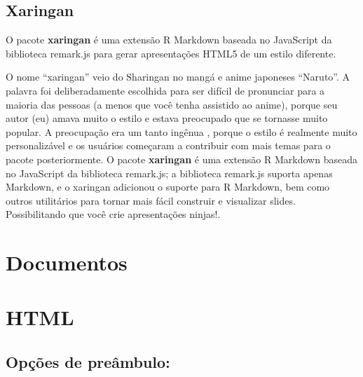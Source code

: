 \documentclass[
]{book}
\begin{document}
\hypertarget{xaringan}{%
\subsection{Xaringan}\label{xaringan}}

O pacote \textbf{xaringan} é uma extensão R Markdown baseada no JavaScript da biblioteca remark.js para gerar apresentações HTML5 de um estilo diferente.

O nome ``xaringan'' veio do Sharingan no mangá e anime japoneses ``Naruto''. A palavra foi deliberadamente escolhida para ser difícil de pronunciar para a maioria das pessoas (a menos que você tenha assistido ao anime), porque seu autor (eu) amava muito o estilo e estava preocupado que se tornasse muito popular. A preocupação era um tanto ingênua , porque o estilo é realmente muito personalizável e os usuários começaram a contribuir com mais temas para o pacote posteriormente.
O pacote \textbf{xaringan} é uma extensão R Markdown baseada no JavaScript da biblioteca remark.js; a biblioteca remark.js suporta apenas Markdown, e o xaringan adicionou o suporte para R Markdown, bem como outros utilitários para tornar mais fácil construir e visualizar slides. Possibilitando que você crie apresentações ninjas!.

\hypertarget{documentos}{%
\section{Documentos}\label{documentos}}

\hypertarget{html}{%
\section{HTML}\label{html}}

\hypertarget{opuxe7uxf5es-de-preuxe2mbulo}{%
\subsection{Opções de preâmbulo:}\label{opuxe7uxf5es-de-preuxe2mbulo}}
\end{document}
